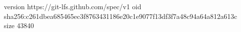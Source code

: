 version https://git-lfs.github.com/spec/v1
oid sha256:c261dbea685465ec3f8763431186e20c1e9077f13df3f7a48c94a64a812a613c
size 43840
